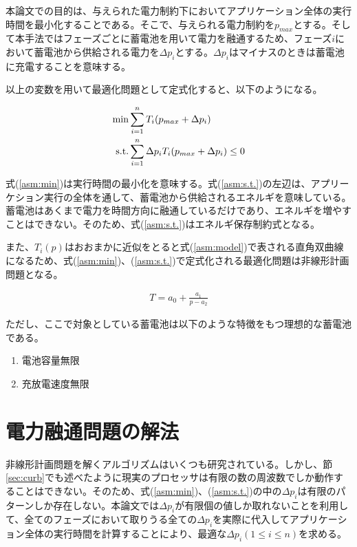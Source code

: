 本論文での目的は、与えられた電力制約下においてアプリケーション全体の実行時間を最小化することである。そこで、与えられる電力制約を$p_{max}$とする。そして本手法ではフェーズごとに蓄電池を用いて電力を融通するため、フェーズ$i$において蓄電池から供給される電力を$\Delta p_i$とする。$\Delta p_i$はマイナスのときは蓄電池に充電することを意味する。

以上の変数を用いて最適化問題として定式化すると、以下のようになる。

\begin{eqnarray}
{\rm min } & \sum_{i=1}^n T_i(p_{max} + \Delta p_i) \label{asm:min} \\
{\rm s.t. } & \sum_{i=1}^n \Delta p_i T_i(p_{max} + \Delta p_i) \leq 0 \label{asm:s.t.}
\end{eqnarray}

式(\ref{asm:min})は実行時間の最小化を意味する。式(\ref{asm:s.t.})の左辺は、アプリーケション実行の全体を通して、蓄電池から供給されるエネルギを意味している。蓄電池はあくまで電力を時間方向に融通しているだけであり、エネルギを増やすことはできない。そのため、式(\ref{asm:s.t.})はエネルギ保存制約式となる。

また、$T_i(p)$はおおまかに近似をとると式(\ref{asm:model})で表される直角双曲線になるため、式(\ref{asm:min})、(\ref{asm:s.t.})で定式化される最適化問題は非線形計画問題となる。

\begin{eqnarray}
T = a_0 + \frac{a_1}{p-a_2} \label{asm:model}
\end{eqnarray}

ただし、ここで対象としている蓄電池は以下のような特徴をもつ理想的な蓄電池である。

\begin{enumerate}
\item 電池容量無限
\item 充放電速度無限
\end{enumerate}


\section{電力融通問題の解法}
\label{sec:algorithm}

非線形計画問題を解くアルゴリズムはいくつも研究されている。しかし、節\ref{sec:curb}でも述べたように現実のプロセッサは有限の数の周波数でしか動作することはできない。そのため、式(\ref{asm:min})、(\ref{asm:s.t.})の中の$\Delta p_i$は有限のパターンしか存在しない。本論文では$\Delta p_i$が有限個の値しか取れないことを利用して、全てのフェーズにおいて取りうる全ての$\Delta p_i$を実際に代入してアプリケーション全体の実行時間を計算することにより、最適な$\Delta p_i(1 \leq i \leq n)$を求める。






